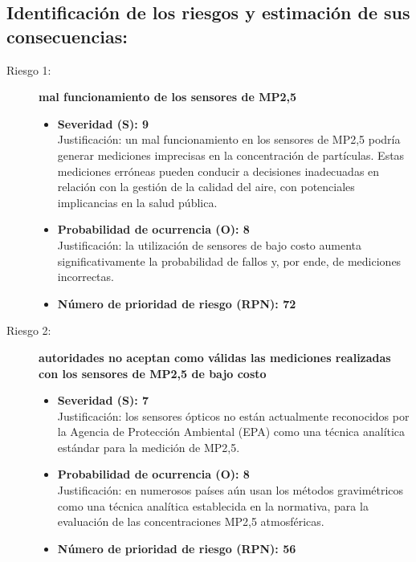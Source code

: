 \subsection{ Identificación de los riesgos y estimación de sus consecuencias:}
\begin{description}
	
	\item[Riesgo 1:]\textbf{mal funcionamiento de los sensores de MP2,5}
	\begin{itemize}
		\item \textbf{Severidad (S): 9} \\
		Justificación: un mal funcionamiento en los sensores de MP2,5 podría generar mediciones imprecisas en la concentración de partículas. Estas mediciones erróneas pueden conducir a decisiones inadecuadas en relación con la gestión de la calidad del aire, con potenciales implicancias en la salud pública.
		
		\item \textbf{Probabilidad de ocurrencia (O): 8} \\
		Justificación: la utilización de sensores de bajo costo aumenta significativamente la probabilidad de fallos y, por ende, de mediciones incorrectas.
		\item \textbf{Número de prioridad de riesgo (RPN): 72} \\
	\end{itemize}
	
	
	\item[Riesgo 2:] \textbf{autoridades no aceptan como válidas las mediciones realizadas con los sensores de MP2,5 de bajo costo}  	 
	\begin{itemize}
		\item \textbf{Severidad (S): 7}\\
		Justificación: los sensores ópticos no están actualmente reconocidos por la Agencia de Protección Ambiental (EPA) como una técnica analítica estándar para la medición de MP2,5.
		
		\item \textbf{Probabilidad de ocurrencia (O): 8} \\
		Justificación: en numerosos países aún usan los métodos gravimétricos como una técnica analítica establecida en la normativa, para la evaluación de las concentraciones MP2,5 atmosféricas.
		\item \textbf{Número de prioridad de riesgo (RPN): 56} \\
	\end{itemize}  
	

\end{description}
